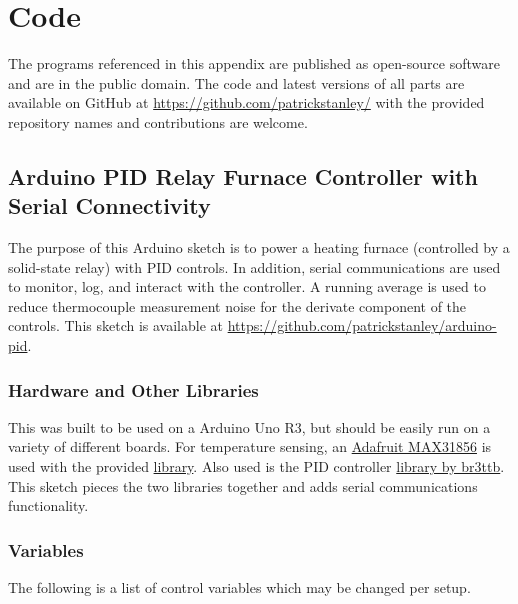 
\chapter{Code}
    The programs referenced in this appendix are published as open-source software and are in the public domain.
    The code and latest versions of all parts are available on GitHub at \href{https://github.com/patrickstanley}{https://github.com/patrickstanley/} with the provided repository names and contributions are welcome.

\section{Arduino PID Relay Furnace Controller with Serial Connectivity}
    \label{app:PID}

    The purpose of this Arduino sketch is to power a heating furnace
    (controlled by a solid-state relay) with PID controls.
    In addition, serial communications are used to monitor, log, and interact with the controller.
    A running average is used to reduce thermocouple measurement noise for the derivate component of the controls.
    This sketch is available at \href{https://github.com/patrickstanley/arduino-pid}{https://github.com/patrickstanley/arduino-pid}.

    \subsection{Hardware and Other Libraries}
        This was built to be used on a Arduino Uno R3, but should be easily run on a variety of different boards.
        For temperature sensing, an \href{https://www.adafruit.com/product/3263}{Adafruit MAX31856} is used with the provided \href{https://github.com/adafruit/Adafruit_MAX31856}{library}.
        Also used is the PID controller \href{https://github.com/br3ttb/Arduino-PID-Library}{library by br3ttb}.
        This sketch pieces the two libraries together and adds serial communications functionality.

    \subsection{Variables}
        The following is a list of control variables which may be changed per setup.

